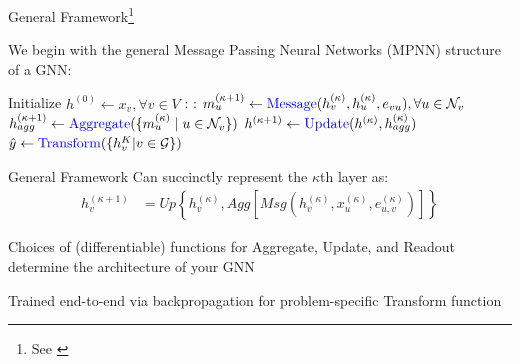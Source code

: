 \documentclass{beamer}
\newcommand{\nhood}{\mathcal{N}}
\newcommand{\Graph}{\mathcal{G}}
\newcommand{\NodeSet}{V}
\newcommand{\node}{v}
\newcommand{\nrepresent}{h}
\newcommand{\edge}{e}
\newcommand{\iter}{\kappa}
\newcommand{\Iter}{K}
\begin{document}
\begin{frame}{
    General Framework\footnote{See \cite{ektefaie_multimodal_2023,gilmer_neural_2017, xu_how_2019}}
    }

    We begin with the general Message Passing Neural Networks (MPNN) structure of a GNN: 

    \vspace{4mm}
    
    \begin{algorithmic}[1]
    \State Initialize $\nrepresent^{(0)} \gets x_\node, \forall \node \in \NodeSet$ 
        \For{$\iter = 0, ..., \Iter$}:
            \For{$\node \in \Graph$}:
            \State $m_u^{(\iter+1)} \gets \text{\textcolor{blue}{Message}}(\nrepresent_\node^{(\iter)}, \nrepresent^{(\iter)}_u, \edge_{\node u}), \forall u \in \nhood_\node$
            \State $\nrepresent_{agg}^{(\iter+1)} \gets \text{\textcolor{blue}{Aggregate}}(\{m_u^{(\iter)} \mid u \in \nhood_\node\})$ 
            \State $\nrepresent^{(\iter+1)} \gets \text{\textcolor{blue}{Update}}(\nrepresent^{(\iter)}, \nrepresent_{agg}^{(\iter)})$
            \EndFor
        \EndFor
        \State $\hat{y} \gets \text{\textcolor{blue}{Transform}}(\{h^\Iter_\node | \node \in \Graph\})$ 
    \end{algorithmic}   

\end{frame}




\begin{frame}{General Framework}
Can succinctly represent the $\iter$th layer as: 
\begin{align*}
\iffalse 
    \mathbf{h}_\node^{(\iter+1)} 
    &=
    \text{Update}
    \left\{ 
    x_\node^{(\iter)}
    ,   
    \text{Aggregate}
    \left[
        \text{Message}
        \left(
        h_\node^{(\iter)}, x_u^{(\iter)}, \edge_{u,\node}^{(\iter)}
        \right)
    \right]
    \right\}
\\
\fi
    h_\node^{(\iter+1)} 
    &=
    Up
    \left\{ 
    \nrepresent_\node^{(\iter)}
    ,   
    Agg
    \left[
        Msg
        \left(
        h_\node^{(\iter)}, x_u^{(\iter)}, \edge_{u,\node}^{(\iter)}
        \right)
    \right]
    \right\}
\end{align*}

Choices of (differentiable) functions for Aggregate, Update, and Readout determine the architecture of your GNN 

\vspace{4mm}

Trained end-to-end via backpropagation for problem-specific Transform function 

\end{frame}
\end{document}
